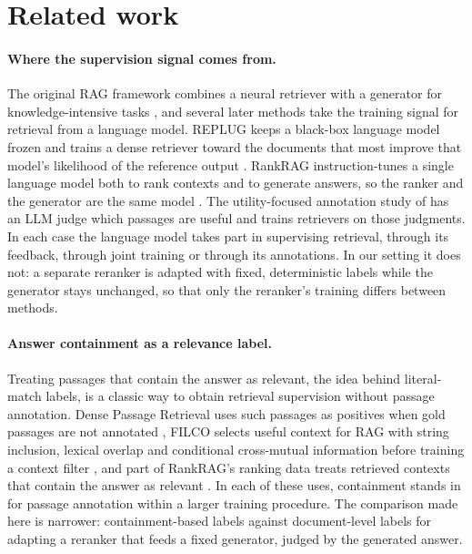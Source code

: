 \section{Related work}
\paragraph{Where the supervision signal comes from.} The original RAG framework combines a neural retriever with a generator for knowledge-intensive tasks \citep{lewis2020}, and several later methods take the training signal for retrieval from a language model. REPLUG keeps a black-box language model frozen and trains a dense retriever toward the documents that most improve that model's likelihood of the reference output \citep{shi2024}. RankRAG instruction-tunes a single language model both to rank contexts and to generate answers, so the ranker and the generator are the same model \citep{yu2024}. The utility-focused annotation study of \citet{zhang2025utility} has an LLM judge which passages are useful and trains retrievers on those judgments. In each case the language model takes part in supervising retrieval, through its feedback, through joint training or through its annotations. In our setting it does not: a separate reranker is adapted with fixed, deterministic labels while the generator stays unchanged, so that only the reranker's training differs between methods.

\paragraph{Answer containment as a relevance label.} Treating passages that contain the answer as relevant, the idea behind literal-match labels, is a classic way to obtain retrieval supervision without passage annotation. Dense Passage Retrieval uses such passages as positives when gold passages are not annotated \citep{karpukhin2020}, FILCO selects useful context for RAG with string inclusion, lexical overlap and conditional cross-mutual information before training a context filter \citep{wang2023filco}, and part of RankRAG's ranking data treats retrieved contexts that contain the answer as relevant \citep{yu2024}. In each of these uses, containment stands in for passage annotation within a larger training procedure. The comparison made here is narrower: containment-based labels against document-level labels for adapting a reranker that feeds a fixed generator, judged by the generated answer.

